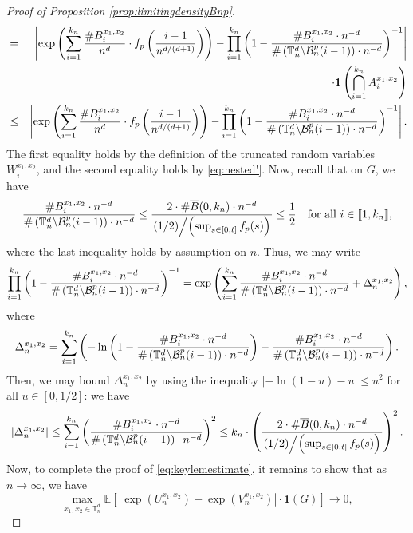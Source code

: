 \documentclass[a4paper,11pt]{article}
\begin{document}
\begin{proof}[Proof of Proposition \ref{prop:limitingdensityBnp}]
\begin{eqnarray*}
&=&\left|\exp\left(\sum_{i=1}^{k_n}\frac{\#B_i^{x_1,x_2}}{n^d}\cdot f_p\left(\frac{i-1}{n^{d/(d+1)}}\right)\right)-\prod_{i=1}^{k_n}\left(1-\frac{\#B_i^{x_1,x_2}\cdot n^{-d}}{\#\left(\mathbb{T}_n^d\middle\backslash\mathcal{B}_n^p(i-1)\right)\cdot n^{-d}}\right)^{-1}\right|\\
&&\cdot\mathbf{1}\left(\bigcap_{i=1}^{k_n}A_i^{x_1,x_2}\right)\\
&\leq&\left|\exp\left(\sum_{i=1}^{k_n}\frac{\#B_i^{x_1,x_2}}{n^d}\cdot f_p\left(\frac{i-1}{n^{d/(d+1)}}\right)\right)-\prod_{i=1}^{k_n}\left(1-\frac{\#B_i^{x_1,x_2}\cdot n^{-d}}{\#\left(\mathbb{T}_n^d\middle\backslash\mathcal{B}_n^p(i-1)\right)\cdot n^{-d}}\right)^{-1}\right|.
\end{eqnarray*}
The first equality holds by the definition of the truncated random variables $W_i^{x_1,x_2}$, and the second equality holds by \eqref{eq:nested'}.
Now, recall that on $G$, we have
\[\frac{\#B_i^{x_1,x_2}\cdot n^{-d}}{\#\left(\mathbb{T}_n^d\middle\backslash\mathcal{B}_n^p(i-1)\right)\cdot n^{-d}}\leq\frac{2\cdot\#\overline{B}(0,k_n)\cdot n^{-d}}{\left.(1/2)\middle/\left(\sup_{s\in[0,t]}f_p(s)\right)\right.}\leq\frac{1}{2}\quad\text{for all $i\in\llbracket1,k_n\rrbracket$,}\]
where the last inequality holds by assumption on $n$.
Thus, we may write
\[\prod_{i=1}^{k_n}\left(1-\frac{\#B_i^{x_1,x_2}\cdot n^{-d}}{\#\left(\mathbb{T}_n^d\middle\backslash\mathcal{B}_n^p(i-1)\right)\cdot n^{-d}}\right)^{-1}=\exp\left(\sum_{i=1}^{k_n}\frac{\#B_i^{x_1,x_2}\cdot n^{-d}}{\#\left(\mathbb{T}_n^d\middle\backslash\mathcal{B}_n^p(i-1)\right)\cdot n^{-d}}+\Delta_n^{x_1,x_2}\right),\]
where
\[\Delta_n^{x_1,x_2}=\sum_{i=1}^{k_n}\left(-\ln\left(1-\frac{\#B_i^{x_1,x_2}\cdot n^{-d}}{\#\left(\mathbb{T}_n^d\middle\backslash\mathcal{B}_n^p(i-1)\right)\cdot n^{-d}}\right)-\frac{\#B_i^{x_1,x_2}\cdot n^{-d}}{\#\left(\mathbb{T}_n^d\middle\backslash\mathcal{B}_n^p(i-1)\right)\cdot n^{-d}}\right).\]
Then, we may bound $\Delta_n^{x_1,x_2}$ by using the inequality $|-\ln(1-u)-u|\leq u^2$ for all $u\in[0,1/2]$: we have
\[\left|\Delta_n^{x_1,x_2}\right|\leq\sum_{i=1}^{k_n}\left(\frac{\#B_i^{x_1,x_2}\cdot n^{-d}}{\#\left(\mathbb{T}_n^d\middle\backslash\mathcal{B}_n^p(i-1)\right)\cdot n^{-d}}\right)^2\leq k_n\cdot\left(\frac{2\cdot\#\overline{B}(0,k_n)\cdot n^{-d}}{\left.(1/2)\middle/\left(\sup_{s\in[0,t]}f_p(s)\right)\right.}\right)^2.\]
Now, to complete the proof of \eqref{eq:keylemestimate}, it remains to show that as $n\to\infty$, we have
\[\max_{x_1,x_2\in\mathbb{T}_n^d}\mathbb{E}\left[\left|\exp\left(U_n^{x_1,x_2}\right)-\exp\left(V_n^{x_1,x_2}\right)\right|\cdot\mathbf{1}(G)\right]\longrightarrow0,\]

\end{proof}
\end{document}
